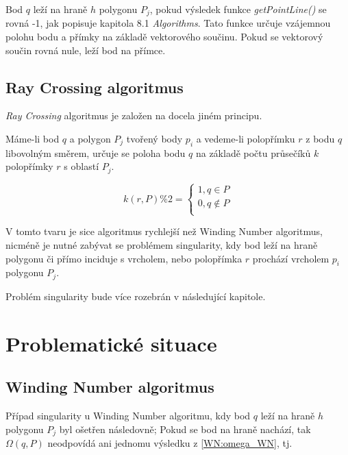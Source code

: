 \documentclass[11pt]{article}
\begin{document}
Bod $q$ leží na hraně $h$ polygonu ${P_{j}}$, pokud výsledek funkce \textit{getPointLine()} se rovná -1, jak popisuje kapitola 8.1 \textit{Algorithms}. Tato funkce určuje vzájemnou polohu bodu a přímky na základě vektorového součinu. Pokud se vektorový součin rovná nule, leží bod na přímce.

\subsection{Ray Crossing algoritmus}
\textit {Ray Crossing} algoritmus je založen na docela jiném principu. 

Máme-li bod $q$ a polygon ${P_{j}}$ tvořený body ${p_{i}}$ a  vedeme-li polopřímku $r$ z bodu $q$ libovolným směrem, určuje se poloha bodu $q$ na základě počtu průsečíků $k$ polopřímky $r$ s oblastí ${P_{j}}$.

\begin{equation}
k(r, P) \% 2= \left\{\begin{array}{l}
1, q \in P \\ 
0, q \notin P \\
\end{array} \right.
\label{RC:k}
\end{equation}

V tomto tvaru je sice algoritmus rychlejší než Winding Number algoritmus, nicméně je nutné zabývat se problémem singularity, kdy bod leží na hraně polygonu či přímo inciduje s vrcholem, nebo polopřímka $r$ prochází vrcholem ${p_{i}}$ polygonu ${P_{j}}$.

Problém singularity bude více rozebrán v následující kapitole.


\section{Problematické situace}

\subsection{Winding Number algoritmus}
Případ singularity u Winding Number algoritmu, kdy bod $q$ leží na hraně $h$ polygonu ${P_{j}}$ byl ošetřen následovně; Pokud se bod na hraně nachází, tak $\Omega(q, P)$ neodpovídá ani jednomu výsledku z \ref{WN:omega_WN}, tj. 
\end{document}
